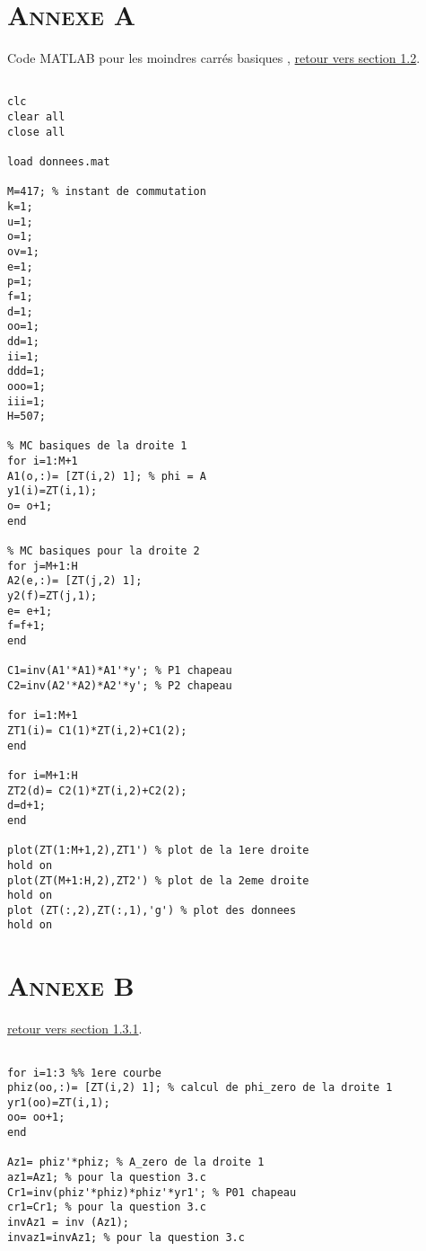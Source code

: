 \begin{appendices}
\chapter*{\textsc{Annexe A}}
	
	Code MATLAB pour les moindres carrés basiques ,\label{Annexe A} \hyperref[section 1.2]{retour vers section 1.2}.

	\begin{lstlisting}	
	 
clc
clear all
close all

load donnees.mat

M=417; % instant de commutation
k=1;
u=1;
o=1;
ov=1;
e=1;
p=1;
f=1;
d=1;
oo=1;
dd=1;
ii=1;
ddd=1;
ooo=1;
iii=1;
H=507;

% MC basiques de la droite 1 
for i=1:M+1
A1(o,:)= [ZT(i,2) 1]; % phi = A
y1(i)=ZT(i,1);
o= o+1;
end

% MC basiques pour la droite 2
for j=M+1:H
A2(e,:)= [ZT(j,2) 1];
y2(f)=ZT(j,1);
e= e+1;
f=f+1;
end

C1=inv(A1'*A1)*A1'*y'; % P1 chapeau
C2=inv(A2'*A2)*A2'*y'; % P2 chapeau

for i=1:M+1
ZT1(i)= C1(1)*ZT(i,2)+C1(2);
end

for i=M+1:H
ZT2(d)= C2(1)*ZT(i,2)+C2(2);
d=d+1;
end

plot(ZT(1:M+1,2),ZT1') % plot de la 1ere droite
hold on
plot(ZT(M+1:H,2),ZT2') % plot de la 2eme droite
hold on
plot (ZT(:,2),ZT(:,1),'g') % plot des donnees
hold on

	\end{lstlisting}
	
	\chapter*{\textsc{Annexe B}}
	
	\label{Annexe B} \hyperref[section 1.3.1]{retour vers section 1.3.1}.

	\begin{lstlisting}	
	 
for i=1:3 %% 1ere courbe
phiz(oo,:)= [ZT(i,2) 1]; % calcul de phi_zero de la droite 1
yr1(oo)=ZT(i,1);
oo= oo+1;
end

Az1= phiz'*phiz; % A_zero de la droite 1
az1=Az1; % pour la question 3.c
Cr1=inv(phiz'*phiz)*phiz'*yr1'; % P01 chapeau
cr1=Cr1; % pour la question 3.c
invAz1 = inv (Az1);
invaz1=invAz1; % pour la question 3.c


\end{lstlisting}
\end{appendices}
